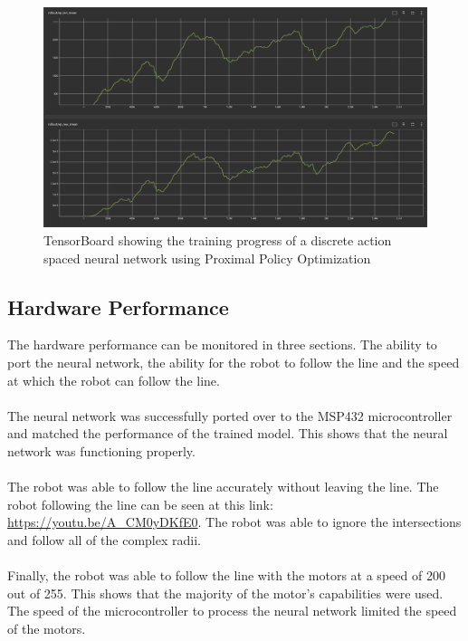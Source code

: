\documentclass[a4paper,12pt]{article}
\begin{document}
\begin{figure}[H]
\centering
\includegraphics[width=15cm]{imgs/ResultsSimulator.png}
\caption{TensorBoard showing the training progress of a discrete action spaced neural network using Proximal Policy Optimization}
\label{fig:ResultsSimulator}
\end{figure}

\subsection{Hardware Performance}
The hardware performance can be monitored in three sections. The ability to port the neural network, the ability for the robot to follow the line and the speed at which the robot can follow the line. 
\\\\
The neural network was successfully ported over to the MSP432 microcontroller and matched the performance of the trained model. This shows that the neural network was functioning properly. 
\\\\
The robot was able to follow the line accurately without leaving the line. The robot following the line can be seen at this link: \url{https://youtu.be/A_CM0yDKfE0}. The robot was able to ignore the intersections and follow all of the complex radii. 
\\\\
Finally, the robot was able to follow the line with the motors at a speed of 200 out of 255. This shows that the majority of the motor's capabilities were used. The speed of the microcontroller to process the neural network limited the speed of the motors.
\end{document}
